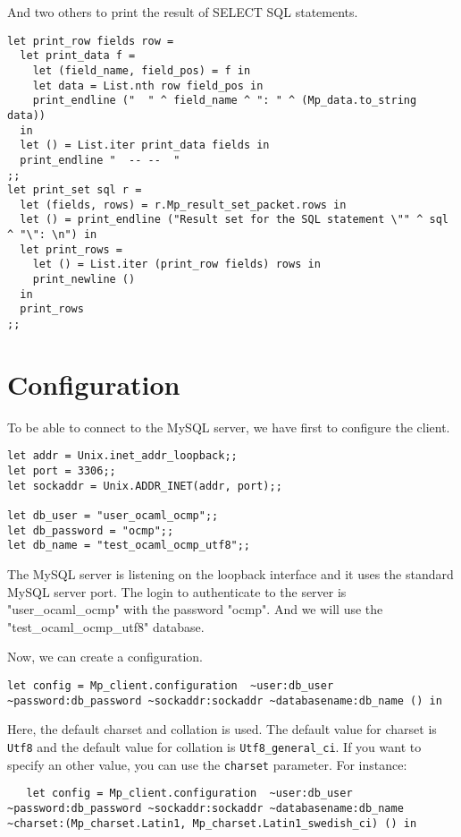 \documentclass[a4paper, english, 11pt]{article}
\begin{document}
And two others to print the result of SELECT SQL statements.

\begin{lstlisting}
let print_row fields row = 
  let print_data f = 
    let (field_name, field_pos) = f in
    let data = List.nth row field_pos in
    print_endline ("  " ^ field_name ^ ": " ^ (Mp_data.to_string data))
  in
  let () = List.iter print_data fields in
  print_endline "  -- --  "
;;
let print_set sql r = 
  let (fields, rows) = r.Mp_result_set_packet.rows in
  let () = print_endline ("Result set for the SQL statement \"" ^ sql ^ "\": \n") in
  let print_rows =   
    let () = List.iter (print_row fields) rows in
    print_newline ()
  in
  print_rows
;;
\end{lstlisting}

\section{Configuration}

To be able to connect to the MySQL server, we have first to configure the client.

\begin{lstlisting}
let addr = Unix.inet_addr_loopback;;
let port = 3306;;
let sockaddr = Unix.ADDR_INET(addr, port);;

let db_user = "user_ocaml_ocmp";;
let db_password = "ocmp";;
let db_name = "test_ocaml_ocmp_utf8";;
\end{lstlisting}

The MySQL server is listening on the loopback interface and it uses the standard MySQL server port. The login to authenticate to the server is "user\_ocaml\_ocmp" with the password "ocmp". And we will use the "test\_ocaml\_ocmp\_utf8" database.

Now, we can create a configuration.

\begin{lstlisting}
let config = Mp_client.configuration  ~user:db_user ~password:db_password ~sockaddr:sockaddr ~databasename:db_name () in
\end{lstlisting}

Here, the default charset and collation is used. The default value for charset is \texttt{Utf8} and the default value for collation is \texttt{Utf8\_general\_ci}. If you want to specify an other value, you can use the \texttt{charset} parameter. For instance:
\begin{lstlisting}
   let config = Mp_client.configuration  ~user:db_user ~password:db_password ~sockaddr:sockaddr ~databasename:db_name ~charset:(Mp_charset.Latin1, Mp_charset.Latin1_swedish_ci) () in
\end{lstlisting}
\end{document}
